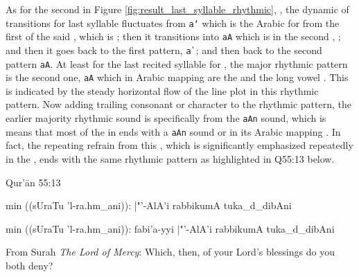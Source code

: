 As for the second   in Figure \ref{fig:result_last_syllable_rhythmic},  , the dynamic of transitions for last syllable fluctuates from \texttt{a`} which is the Arabic for  from the first   of the said  , which is  ; then it transitions into \verb|aA| which is in the second  ,  ; and then it goes back to the first pattern, \verb|a`|; and then back to the second pattern \verb|aA|. At least for the last recited syllable for  , the major rhythmic pattern is the second one, \verb|aA| which in Arabic mapping are the   and the long vowel  . This is indicated by the steady horizontal flow of the line plot in this rhythmic pattern. Now adding trailing consonant or character to the rhythmic pattern, the earlier majority rhythmic sound is specifically from the \verb|aAn| sound, which is means that most of the   in   ends with a \verb|aAn| sound or in its Arabic mapping  . In fact, the repeating refrain from this  , which is significantly emphasized repeatedly in the  , ends with the same rhythmic pattern as highlighted in Q55:13 below.

\begin{bottomtitledframe}{Qur'\=an 55:13}
    \begin{center}
        \begin{arab}
            min ((sUraTu 'l-ra.hm_ani)):  |"'-AlA'i rabbikumA tuka_d_dibAni
        \end{arab}
        \begin{arab}[trans]
            min ((sUraTu 'l-ra.hm_ani)): fabi'a-yyi |"'-AlA'i rabbikumA tuka_d_dibAni
        \end{arab}
    \end{center}
    From Surah \textit{The Lord of Mercy}: Which, then, of your Lord's blessings do you both deny?
\end{bottomtitledframe}

